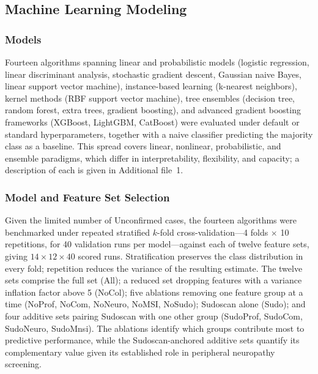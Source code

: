 \documentclass[pdflatex,sn-mathphys-num]{sn-jnl}%
\theoremstyle{thmstyleone}%
\theoremstyle{thmstyletwo}%
\theoremstyle{thmstylethree}%
\begin{document}
\subsection{Machine Learning Modeling}

\subsubsection{Models}
\label{sec:models}

Fourteen algorithms spanning linear and probabilistic models (logistic regression, linear
discriminant analysis, stochastic gradient descent, Gaussian naive Bayes, linear support vector
machine), instance-based learning (k-nearest neighbors), kernel methods (RBF support vector
machine), tree ensembles (decision tree, random forest, extra trees, gradient boosting), and
advanced gradient boosting frameworks (XGBoost, LightGBM, CatBoost) were evaluated
under default or standard hyperparameters, together with a naive classifier predicting the majority
class as a baseline. This spread covers linear, nonlinear, probabilistic, and ensemble paradigms,
which differ in interpretability, flexibility, and capacity; a description of each is given in
Additional file~1.

\subsubsection{Model and Feature Set Selection}
\label{sec:modelselection}

Given the limited number of Unconfirmed cases, the fourteen algorithms were benchmarked under
repeated stratified $k$-fold cross-validation---4 folds $\times$ 10 repetitions, for 40 validation
runs per model---against each of twelve feature sets, giving $14 \times 12 \times 40$ scored runs.
Stratification preserves the class distribution in every fold; repetition reduces the variance of
the resulting estimate. The twelve sets comprise the full set (All); a reduced set dropping features
with a variance inflation factor above 5 (NoCol); five ablations removing one feature group at a
time (NoProf, NoCom, NoNeuro, NoMSI, NoSudo); Sudoscan alone (Sudo); and four additive sets pairing
Sudoscan with one other group (SudoProf, SudoCom, SudoNeuro, SudoMnsi). The ablations identify which
groups contribute most to predictive performance, while the Sudoscan-anchored additive sets quantify
its complementary value given its established role in peripheral neuropathy screening.
\end{document}
